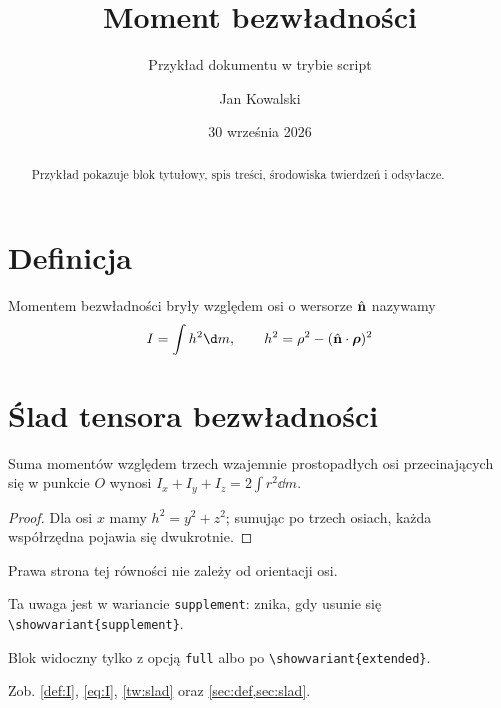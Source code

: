 \documentclass[a4paper, polish, 11pt]{scrartcl}
\title{Moment bezwładności}
\subtitle{Przykład dokumentu w trybie script}
\author{Jan Kowalski}
\date{30 września 2026}
\begin{document}
\maketitle

\begin{abstract}
Przykład pokazuje blok tytułowy, spis treści, środowiska twierdzeń
i odsyłacze.
\end{abstract}

\tableofcontents

\section{Definicja}\label{sec:def}
\begin{definition}\label{def:I}
Momentem bezwładności bryły względem osi o wersorze $\vu{n}$ nazywamy
\begin{equation}
	I = \int h^2 \dd m, \qquad h^2 = \rho^2 - (\vu{n} \vdot \vb{\rho})^2
	\label{eq:I}
\end{equation}
\end{definition}

\section{Ślad tensora bezwładności}\label{sec:slad}
\begin{theorem}\label{tw:slad}
Suma momentów względem trzech wzajemnie prostopadłych osi
przecinających się w punkcie $O$ wynosi
$I_x + I_y + I_z = 2 \int r^2 \dd m$.
\end{theorem}
\begin{proof}
Dla osi $x$ mamy $h^2 = y^2 + z^2$; sumując po trzech osiach, każda
współrzędna pojawia się dwukrotnie.
\end{proof}

\begin{fact}\label{f:niezm}
Prawa strona tej równości nie zależy od orientacji osi.
\end{fact}

\begin{supplement}
\begin{remark}
Ta uwaga jest w wariancie \texttt{supplement}: znika, gdy usunie się
\verb|\showvariant{supplement}|.
\end{remark}
\end{supplement}

\begin{extended}
\begin{aside}
Blok widoczny tylko z opcją \texttt{full} albo po
\verb|\showvariant{extended}|.
\end{aside}
\end{extended}

Zob. \cref{def:I}, \cref{eq:I}, \cref{tw:slad} oraz \cref{sec:def,sec:slad}.
\end{document}
